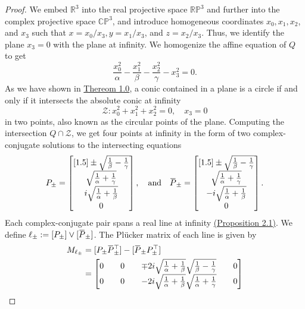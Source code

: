 \documentclass[10pt, a4paper]{article}
\newcommand{\overbar}[1]{\mkern 1.5mu\overline{\mkern-1.5mu#1\mkern-1.5mu}\mkern 1.5mu}
\theoremstyle{BoldTopSpacing}
\theoremstyle{BoldTopSpacing}
\theoremstyle{BoldTopSpacing}
\theoremstyle{BoldTopBottomSpacing}
\theoremstyle{BoldTopSpacing}
\theoremstyle{BoldTopBottomSpacing}
\theoremstyle{remark}
\begin{document}
\begin{proof}
    We embed $\mathbb{R}^3$ into the real projective space $\mathbb{R}\mathbb{P}^3$ and further into the complex projective space $\mathbb{C}\mathbb{P}^3$, and introduce homogeneous coordinates $x_{0}, x_{1}, x_{2}$, and $x_{3}$ such that $x = x_{0} / x_{3}, y = x_{1} / x_{3}$, and $z = x_{2} / x_{3}$. Thus, we identify the plane $x_{3} = 0$ with the plane at infinity. \newline
We homogenize the affine equation of $Q$ to get
\[
    \frac{x_{0}^2}{\alpha} - \frac{x_{1}^2}{\beta} - \frac{x_{2}^2}{\gamma} - x_{3}^2 = 0.
\]
As we have shown in \hyperref[thm:span-real-line]{Thereom 1.0}, a conic contained in a plane is a circle if and only if it intersects the absolute conic at infinity
\[
    \mathcal{Z} : x_{0}^2 + x_{1}^2 + x_{2}^2 = 0, \quad x_{3} = 0
\]
in two points, also known as the circular points of the plane. Computing the intersection $Q \cap \mathcal{Z}$, we get four points at infinity in the form of two complex-conjugate solutions to the intersecting equations
\[
P_{\pm} =
\begin{bmatrix}[1.5]
\pm \sqrt{\frac{1}{\beta} - \frac{1}{\gamma}}\\
\sqrt{\frac{1}{\alpha} + \frac{1}{\gamma}}\\
i\sqrt{\frac{1}{\alpha} + \frac{1}{\beta}}\\
0
\end{bmatrix},
\quad \text{and} \quad
\overbar{P}_{\pm} =
\begin{bmatrix}[1.5]
\pm \sqrt{\frac{1}{\beta} - \frac{1}{\gamma}}\\
\sqrt{\frac{1}{\alpha} + \frac{1}{\gamma}}\\
-i\sqrt{\frac{1}{\alpha} + \frac{1}{\beta}}\\
0
\end{bmatrix}.
\]
Each complex-conjugate pair spans a real line at infinity \hyperref[thm:span-real-line]{(Proposition 2.1)}. We define $\ell_{\pm} := [P_{\pm}] \vee [\overbar{P}_{\pm}]$. The Plücker matrix of each line is given by
\begin{align*}
M_{\ell_{\pm}} &= [P_{\pm} \overbar{P}_{\pm}^{\top}] - [\overbar{P}_{\pm} P_{\pm}^{\top}]\\
&= \begin{bmatrix}
0 && 0 && \mp 2 i \sqrt{\frac{1}{\alpha} + \frac{1}{\beta}} \sqrt{\frac{1}{\beta} - \frac{1}{\gamma}} && 0\\
0 && 0 && -2 i \sqrt{\frac{1}{\alpha} + \frac{1}{\beta}} \sqrt{\frac{1}{\alpha} + \frac{1}{\gamma}} && 0\\

\end{bmatrix}
\end{align*}
\end{proof}
\end{document}
